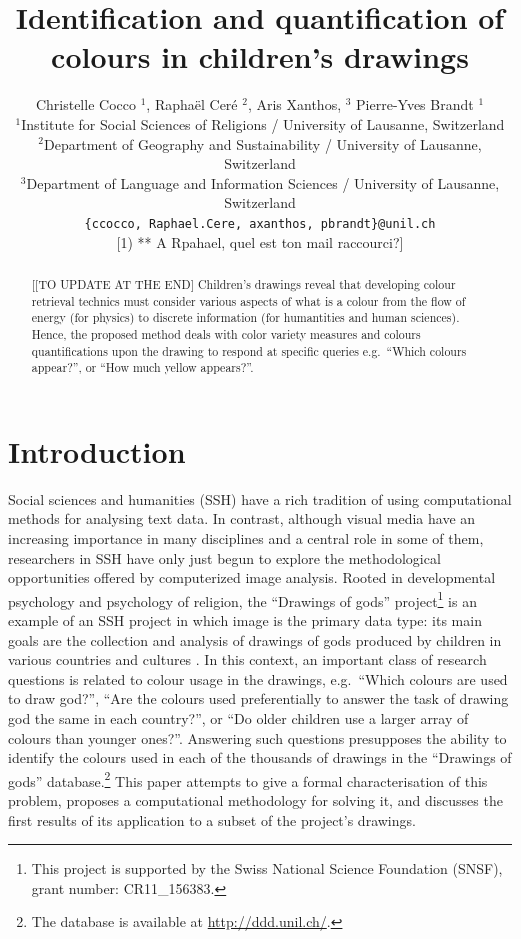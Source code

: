 \documentclass[11pt,a4paper]{article}
\title{Identification and quantification of colours in children's drawings}
\author{Christelle Cocco ${}^1$, Rapha\"el Cer\'e ${}^2$, Aris Xanthos, ${}^3$  Pierre-Yves Brandt ${}^1$\\
  ${}^1$Institute for Social Sciences of Religions / University of Lausanne, Switzerland \\
  ${}^2$Department of Geography and Sustainability / University of Lausanne, Switzerland \\
  ${}^3$Department of Language and Information Sciences / University of Lausanne, Switzerland \\
  {\tt \{ccocco, Raphael.Cere, axanthos, pbrandt\}@unil.ch} \\
  {\color{red} [1) ** A Rpahael, quel est ton mail raccourci?]}
  }
\date{}
\begin{document}
\maketitle
\begin{abstract}
{\color{red}[[TO UPDATE AT THE END]}
{\color{gray}Children's drawings reveal that developing colour retrieval technics
must consider various aspects of what is a colour from the flow of
energy (for physics) to discrete information (for humantities and human
sciences). Hence, the proposed method deals with color variety measures
and colours quantifications upon the drawing to respond at specific
queries e.g.~``Which colours appear?'', or ``How much yellow appears?''.}
\end{abstract}


\section{Introduction}\label{introduction}
\label{sec:introduction}

Social sciences and humanities (SSH) have a rich tradition of using computational methods for analysing text data. In contrast, although visual media have an increasing importance in many disciplines and a central role in some of them, researchers in SSH have only just begun to explore the methodological opportunities offered by computerized image analysis. Rooted in developmental psychology and psychology of religion, the ``Drawings of gods'' project\footnote{This project is supported by the Swiss National Science Foundation (SNSF), grant number: CR11\_156383.} is an example of an SSH project in which image is the primary data type: its main goals are the collection and analysis of drawings of gods produced by children in various countries and cultures \cite[see e.g.][]{BrandtKagataSpittelerGillieronPaleologue2009,Dandarova2013,DandarovaRobertDessartSerbaevaEtAl2016}. In this context, an important class of research questions is related to colour usage in the drawings, e.g.~``Which colours are used to draw god?'', ``Are the colours used preferentially to answer the task of drawing god the same in each country?'', or ``Do older children use a larger array of colours than younger ones?''. Answering such questions presupposes the ability to identify the colours used in each of the thousands of drawings in the ``Drawings of gods'' database.\footnote{The database is available at \url{http://ddd.unil.ch/}.} This paper attempts to give a formal characterisation of this problem, proposes a computational methodology for solving it, and discusses the first results of its application to a subset of the project's drawings.
\end{document}
